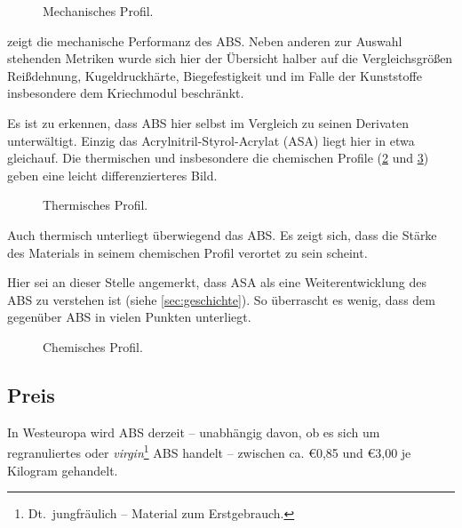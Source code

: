             \begin{figure}[H]
                \centering
                
                \caption{Mechanisches Profil.}
                \label{fig:pc mechanical profile}
            \end{figure}\par
             zeigt die mechanische Performanz des ABS\@. Neben anderen zur Auswahl stehenden
            Metriken wurde sich hier der Übersicht halber auf die Vergleichsgrößen Reißdehnung, Kugeldruckhärte, Biegefestigkeit
            und im Falle der Kunststoffe insbesondere dem Kriechmodul beschränkt.

            Es ist zu erkennen, dass ABS hier selbst im Vergleich zu seinen Derivaten unterwältigt. Einzig das
            Acrylnitril-Styrol-Acrylat (ASA) liegt hier in etwa gleichauf. Die thermischen und insbesondere die chemischen Profile
            (\cref{fig:pc thermal profile} und \cref{fig:pc chemical profile}) geben eine leicht differenzierteres Bild.
            \begin{figure}[H]
                \centering
                
                \caption{Thermisches Profil.}%
                \label{fig:pc thermal profile}
            \end{figure}
            
            Auch thermisch unterliegt überwiegend das ABS\@. Es zeigt sich, dass die Stärke des Materials in seinem chemischen
            Profil verortet zu sein scheint.

            Hier sei an dieser Stelle angemerkt, dass ASA als eine Weiterentwicklung des ABS zu verstehen ist (siehe \cref{sec:geschichte}).
            So überrascht es wenig, dass dem gegenüber ABS in vielen Punkten unterliegt.
            \begin{figure}[H]
                \centering
                
                \caption{Chemisches Profil.}%
                \label{fig:pc chemical profile}
            \end{figure}
            \nocite{datenblattsammlung.KERN.20210201}
        \subsection{Preis}
        In Westeuropa wird ABS derzeit – unabhängig davon, ob es sich um regranuliertes oder \textit{virgin}\footnote{Dt.\ jungfräulich – Material zum Erstgebrauch.}
        ABS handelt – zwischen ca. €0,85 und €3,00 je Kilogram gehandelt.
